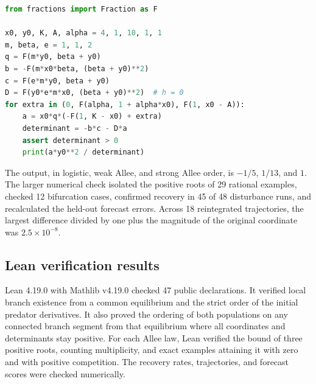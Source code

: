 \begin{lstlisting}[language=Python,basicstyle=\ttfamily\footnotesize]
from fractions import Fraction as F

x0, y0, K, A, alpha = 4, 1, 10, 1, 1
m, beta, e = 1, 1, 2
q = F(m*y0, beta + y0)
b = -F(m*x0*beta, (beta + y0)**2)
c = F(e*m*y0, beta + y0)
D = F(y0*e*m*x0, (beta + y0)**2)  # h = 0
for extra in (0, F(alpha, 1 + alpha*x0), F(1, x0 - A)):
    a = x0*q*(-F(1, K - x0) + extra)
    determinant = -b*c - D*a
    assert determinant > 0
    print(a*y0**2 / determinant)
\end{lstlisting}
The output, in logistic, weak Allee, and strong Allee order, is $-1/5$, $1/13$, and $1$. The larger numerical check isolated the positive roots of 29 rational examples, checked 12 bifurcation cases, confirmed recovery in 45 of 48 disturbance runs, and recalculated the held-out forecast errors. Across 18 reintegrated trajectories, the largest difference divided by one plus the magnitude of the original coordinate was $2.5\times10^{-8}$.

\subsection*{Lean verification results}
Lean 4.19.0 with Mathlib v4.19.0 checked 47 public declarations. It verified local branch existence from a common equilibrium and the strict order of the initial predator derivatives. It also proved the ordering of both populations on any connected branch segment from that equilibrium where all coordinates and determinants stay positive. For each Allee law, Lean verified the bound of three positive roots, counting multiplicity, and exact examples attaining it with zero and with positive competition. The recovery rates, trajectories, and forecast scores were checked numerically.
